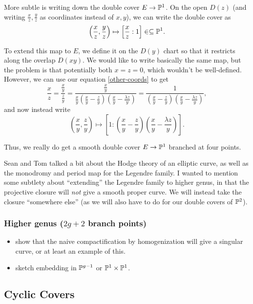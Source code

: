 \documentclass[12pt]{article}
\begin{document}
More subtle is writing down the double cover $E\to \P^1$. On the open $D(z)$ (and writing $\frac{x}{z},\frac{y}{z}$ as coordinates instead of $x,y$), we can write the double cover as
\[\left(\frac{x}{z},\frac{y}{z}\right) \mapsto \left[\frac{x}{z}:1\right] \in \subseteq \P^1.\]

To extend this map to $E$, we define it on the $D(y)$ chart so that it restricts along the overlap $D(xy)$. We would like to write basically the same map, but the problem is that potentially both $x=z=0$, which wouldn't be well-defined. However, we can use our equation \ref{other-coords} to get
\[\frac{x}{z} = \frac{\frac{x}{y}}{\frac{z}{y}} = \frac{\frac{x}{y}}{\frac{x}{y}\left(\frac{x}{y}-\frac{z}{y}\right)\left(\frac{x}{y}-\frac{\lambda z}{y}\right)} = \frac{1}{\left(\frac{x}{y}-\frac{z}{y}\right)\left(\frac{x}{y}-\frac{\lambda z}{y}\right)},\]
and now instead write
\[\left(\frac{x}{y},\frac{z}{y}\right) \mapsto \left[1:\left(\frac{x}{y}-\frac{z}{y}\right)\left(\frac{x}{y}-\frac{\lambda z}{y}\right)\right].\]

Thus, we really do get a smooth double cover $E\to \P^1$ branched at four points.

Sean and Tom talked a bit about the Hodge theory of an elliptic curve, as well as the monodromy and period map for the Legendre family. I wanted to mention some subtlety about ``extending'' the Legendre family to higher genus, in that the projective closure will \textit{not} give a smooth proper curve. We will instead take the closure ``somewhere else'' (as we will also have to do for our double covers of $\P^2$).

\subsubsection{Higher genus (\texorpdfstring{$2g+2$}{2g+2} branch points)}

{\color{red} 
\begin{itemize}
    \item show that the naive compactification by homogenization will give a singular curve, or at least an example of this.
    \item sketch embedding in $\P^{g-1}$ or $\P^1 \times \P^1$.
\end{itemize}}


\subsection{Cyclic Covers}
\end{document}
